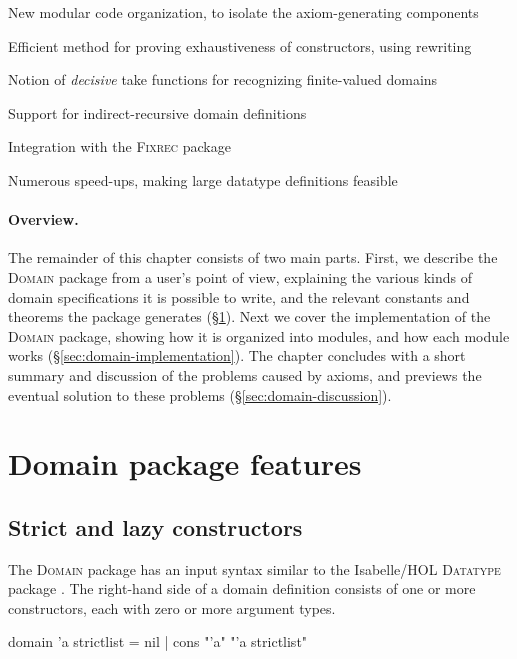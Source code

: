 \begin{itemize*}
\item New modular code organization, to isolate the axiom-generating components
\item Efficient method for proving exhaustiveness of constructors, using rewriting
\item Notion of \emph{decisive} take functions for recognizing finite-valued domains
\item Support for indirect-recursive domain definitions
\item Integration with the \textsc{Fixrec} package
\item Numerous speed-ups, making large datatype definitions feasible
\end{itemize*}

\paragraph{Overview.}

The remainder of this chapter consists of two main parts. First, we describe the \textsc{Domain} package from a user's point of view, explaining the various kinds of domain specifications it is possible to write, and the relevant constants and theorems the package generates (\S\ref{sec:domain-features}). Next we cover the implementation of the \textsc{Domain} package, showing how it is organized into modules, and how each module works (\S\ref{sec:domain-implementation}). The chapter concludes with a short summary and discussion of the problems caused by axioms, and previews the eventual solution to these problems (\S\ref{sec:domain-discussion}).

\section{Domain package features}
\label{sec:domain-features}

\subsection{Strict and lazy constructors}

The \textsc{Domain} package has an input syntax similar to the Isabelle/HOL \textsc{Datatype} package \cite{isabelle-tutorial}. The right-hand side of a domain definition consists of one or more constructors, each with zero or more argument types.

\begin{isacode}
domain 'a strictlist = nil | cons "'a" "'a strictlist"
\end{isacode}

